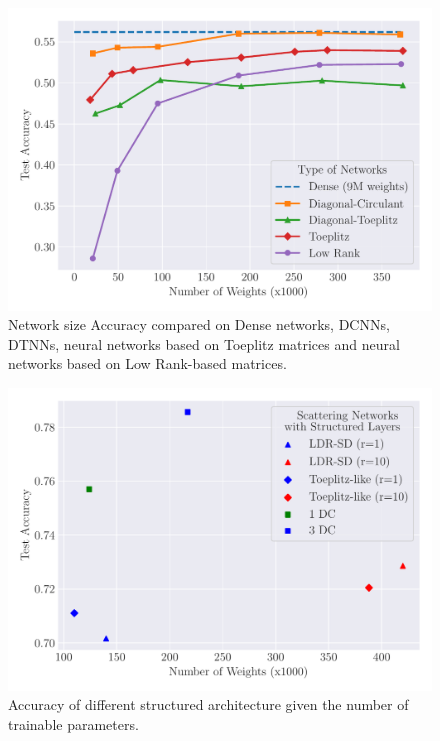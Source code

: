 %    


\begin{figure}
   \centering
   \includegraphics[width=\scalefigure\textwidth]{figures/main/ch4-diagonal_circulant/cifar10_type.pdf}
   \caption{Network size \vs Accuracy compared on Dense networks, DCNNs, DTNNs, neural networks based on Toeplitz matrices and neural networks based on Low Rank-based matrices.} 
   \label{figure:ch4-cifar10_type}
\end{figure}



\begin{figure}
   \centering
   \includegraphics[width=\scalefigure\textwidth]{figures/main/ch4-diagonal_circulant/scatterplot.pdf}
   \caption{Accuracy of different structured architecture given the number of trainable parameters.}
   \label{figure:ch4-cifar10_with_channels_xp}
\end{figure}





